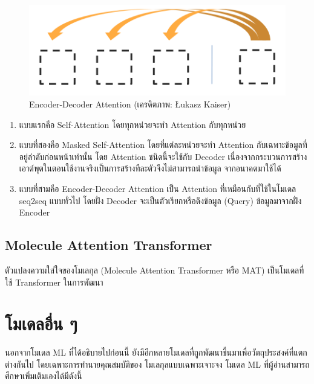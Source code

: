 \begin{figure}[htbp]
    \centering
    \includegraphics[width=0.6\linewidth]{fig/attention_3_enc-dec.png}
    \caption{Encoder-Decoder Attention (เครดิตภาพ: Łukasz Kaiser)}
    \label{fig:enc_dec_attention}
\end{figure}

\begin{enumerate}
    \item แบบแรกคือ Self-Attention โดยทุกหน่วยจะทำ Attention กับทุกหน่วย

    \item แบบที่สองคือ Masked Self-Attention โดยที่แต่ละหน่วยจะทำ Attention กับเฉพาะข้อมูลที่อยู่ลำดับก่อนหน้าเท่านั้น 
    โดย Attention ชนิดนี้จะใช้กับ Decoder เนื่องจากกระบวนการสร้างเอาต์พุตในตอนใช้งานจริงเป็นการสร้างทีละตัวจึงไม่สามารถนำข้อมูล%
    จากอนาคตมาใช้ได้

    \item แบบที่สามคือ Encoder-Decoder Attention เป็น Attention ที่เหมือนกับที่ใช้ในโมเดล seq2seq แบบทั่วไป โดยฝั่ง Decoder 
    จะเป็นตัวเรียกหรือดึงข้อมูล (Query) ข้อมูลมาจากฝั่ง Encoder
\end{enumerate}

\subsection{Molecule Attention Transformer}
\label{ssec:mol_transformer}

ตัวแปลงความใส่ใจของโมเลกุล (Molecule Attention Transformer หรือ MAT)\autocite{maziarka2020} เป็นโมเดลที่ใช้ Transformer
ในการพัฒนา

\section{โมเดลอื่น ๆ}
\label{sec:other_ml_qm_models}

นอกจากโมเดล ML ที่ได้อธิบายไปก่อนนี้ ยังมีอีกหลายโมเดลที่ถูกพัฒนาขึ้นมาเพื่อวัตถุประสงค์ที่แตกต่างกันไป โดยเฉพาะการทำนายคุณสมบัติของ%
โมเลกุลแบบเฉพาะเจาะจง โมเดล ML ที่ผู้อ่านสามารถศึกษาเพิ่มเติมเองได้มีดังนี้

